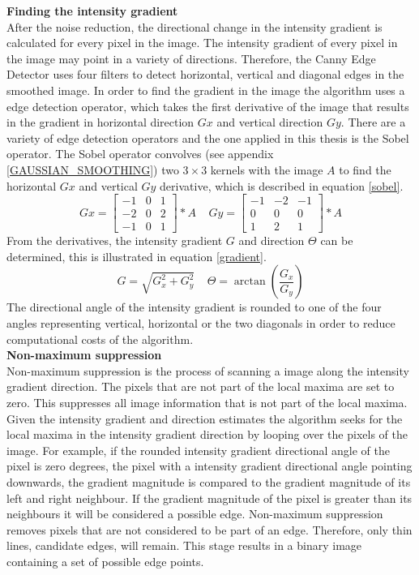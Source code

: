 \documentclass[a4paper]{article}
\begin{document}
\noindent\textbf{Finding the intensity gradient}\\
After the noise reduction, the directional change in the intensity gradient is calculated for every pixel in the image. The intensity gradient of every pixel in the image may point in a variety of directions. Therefore, the Canny Edge Detector uses four filters to detect horizontal, vertical and diagonal edges in the smoothed image. In order to find the gradient in the image the algorithm uses a edge detection operator, which takes the first derivative of the image that results in the gradient in horizontal direction $Gx$ and vertical direction $Gy$. There are a variety of edge detection operators and the one applied in this thesis is the Sobel operator. The Sobel operator convolves (see appendix \ref{GAUSSIAN_SMOOTHING}) two $3\times3$ kernels with the image $A$ to find the horizontal $Gx$ and vertical  $Gy$ derivative, which is described in equation \ref{sobel}.
\begin{equation}
\label{sobel}
Gx =
\begin{bmatrix}
-1 & 0 & 1\\
-2 & 0 & 2\\
-1 & 0 & 1
\end{bmatrix}
* A\ \ \ \ \ 
Gy =
\begin{bmatrix}
-1 & -2 & -1\\
0 & 0 & 0\\
1 & 2 & 1
\end{bmatrix}
* A
\end{equation}
From the derivatives, the intensity gradient $G$ and direction $\Theta$ can be determined, this is illustrated in equation \ref{gradient}.
\begin{equation}
\label{gradient}
G = \sqrt{G_x^2  + G_y^2}\ \ \ \ \ 
\Theta = \arctan(\frac{G_x}{G_y})
\end{equation}
The directional angle of the intensity gradient is rounded to one of the four angles representing vertical, horizontal or the two diagonals in order to reduce computational costs of the algorithm.\\ 

\noindent\textbf{Non-maximum suppression}\\
Non-maximum suppression is the process of scanning a image along the intensity gradient direction. The pixels that are not part of the local maxima are set to zero. This suppresses all image information that is not part of the local maxima. Given the intensity gradient and direction estimates the algorithm seeks for the local maxima in the intensity gradient direction by looping over the pixels of the image. For example, if the rounded intensity gradient directional angle of the pixel is zero degrees, the pixel with a intensity gradient directional angle pointing downwards, the gradient magnitude is compared to the gradient magnitude of its left and right neighbour. If the gradient magnitude of the pixel is greater than its neighbours it will be considered a possible edge. Non-maximum suppression removes pixels that are not considered to be part of an edge. Therefore, only thin lines, candidate edges, will remain. This stage results in a binary image containing a set of possible edge points.\\
\end{document}
